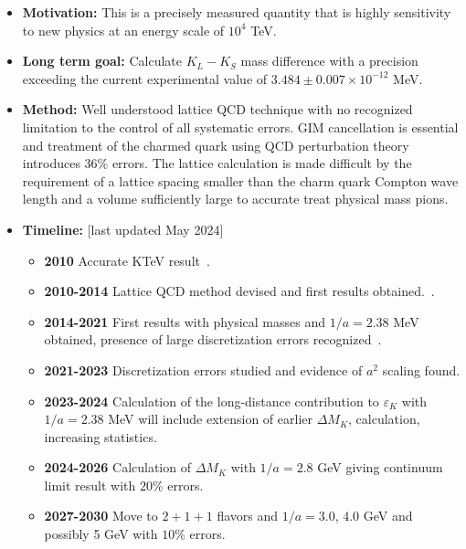 \documentclass[12pt,hyperpdf]{article}
\begin{document}
\begin{itemize}
    \item{\bf Motivation:} This is a precisely measured quantity that is highly sensitivity to new physics 
    at an energy scale of $10^4$ TeV.
    \item{\bf Long term goal:} Calculate $K_L - K_S$ mass difference with
    a precision exceeding the current experimental value of $3.484
    \pm 0.007 \times  10^{-12}$ MeV.
    \item{\bf Method:} Well understood lattice QCD technique with no
    recognized limitation to the control of all systematic
    errors. GIM cancellation is essential and treatment of the
    charmed quark using QCD perturbation theory introduces 36\%
    errors. The lattice calculation is made diﬀicult by the
    requirement of a lattice spacing smaller than the charm quark
    Compton wave length and a volume suﬀiciently large to accurate
    treat physical mass pions. 
\item{\bf Timeline:} \hfill [last updated May 2024]
\begin{itemize}
    \item{\bf 2010} Accurate KTeV result~\cite{KTeV:2010sng}.
    \item{\bf 2010-2014} Lattice QCD method devised and first results 
    obtained.~\cite{Christ:2012se, Bai:2014cva}.
    \item{\bf 2014-2021} First results with physical masses and $1/a = 2.38$ MeV 
    obtained, presence of large discretization errors recognized~\cite{Bai:2018lrm, 
    Wang:2021twm}.
    \item{\bf 2021-2023} Discretization errors studied and evidence of $a^2$ scaling 
    found.
    \item{\bf 2023-2024} Calculation of the long-distance contribution to
    $\varepsilon_K$ with $1/a = 2.38$ MeV will include extension of
    earlier $\Delta M_K$, calculation, increasing statistics.
    \item{\bf 2024-2026} Calculation of $\Delta M_K$ with $1/a = 2.8$ GeV
    giving continuum limit result with $20$\% errors. 
    \item{\bf 2027-2030} Move to $2+1+1$ flavors and $1/a = 3.0$, $4.0$
    GeV and possibly 5 GeV with $10$\% errors. 
\end{itemize}
\end{itemize}

\end{document}
